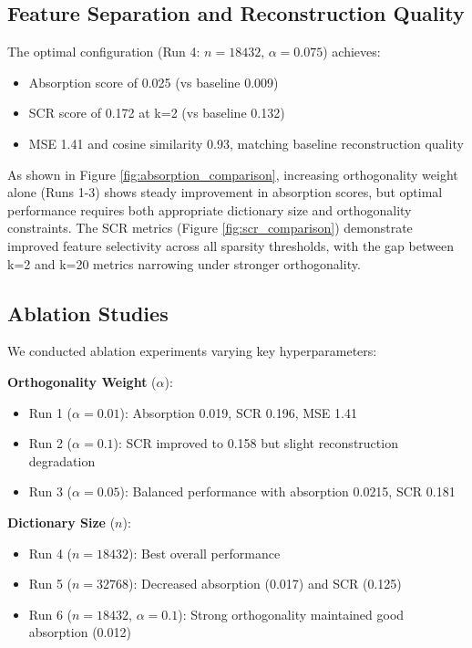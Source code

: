 \documentclass{article} %
\begin{document}
\subsection{Feature Separation and Reconstruction Quality}
The optimal configuration (Run 4: $n=18432$, $\alpha=0.075$) achieves:
\begin{itemize}
    \item Absorption score of 0.025 (vs baseline 0.009)
    \item SCR score of 0.172 at k=2 (vs baseline 0.132) 
    \item MSE 1.41 and cosine similarity 0.93, matching baseline reconstruction quality
\end{itemize}

As shown in Figure \ref{fig:absorption_comparison}, increasing orthogonality weight alone (Runs 1-3) shows steady improvement in absorption scores, but optimal performance requires both appropriate dictionary size and orthogonality constraints. The SCR metrics (Figure \ref{fig:scr_comparison}) demonstrate improved feature selectivity across all sparsity thresholds, with the gap between k=2 and k=20 metrics narrowing under stronger orthogonality.

\subsection{Ablation Studies}
We conducted ablation experiments varying key hyperparameters:

\textbf{Orthogonality Weight} ($\alpha$):
\begin{itemize}
    \item Run 1 ($\alpha=0.01$): Absorption 0.019, SCR 0.196, MSE 1.41
    \item Run 2 ($\alpha=0.1$): SCR improved to 0.158 but slight reconstruction degradation
    \item Run 3 ($\alpha=0.05$): Balanced performance with absorption 0.0215, SCR 0.181
\end{itemize}

\textbf{Dictionary Size} ($n$):
\begin{itemize}
    \item Run 4 ($n=18432$): Best overall performance
    \item Run 5 ($n=32768$): Decreased absorption (0.017) and SCR (0.125)
    \item Run 6 ($n=18432$, $\alpha=0.1$): Strong orthogonality maintained good absorption (0.012)
\end{itemize}
\end{document}
